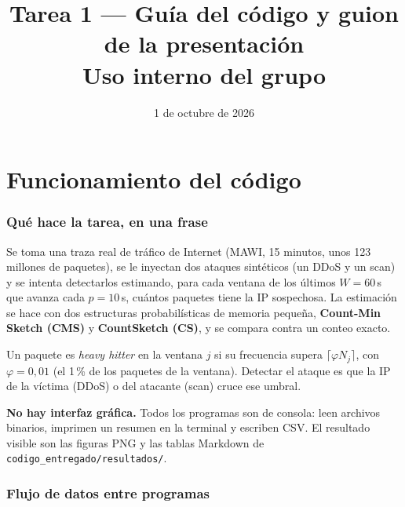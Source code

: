 \documentclass[11pt]{article}
\title{Tarea 1 — Guía del código y guion de la presentación\\[4pt]\large Uso interno del grupo}
\author{}
\date{1 de octubre de 2026}
\newcommand{\code}[1]{\texttt{#1}}
\begin{document}
\maketitle
\tableofcontents
\bigskip


\part{Funcionamiento del código}

\section{Qué hace la tarea, en una frase}

Se toma una traza real de tráfico de Internet (MAWI, 15 minutos, unos 123 millones de paquetes), se le inyectan dos ataques sintéticos (un DDoS y un scan) y se intenta detectarlos estimando, para cada ventana de los últimos $W=60$\,s que avanza cada $p=10$\,s, cuántos paquetes tiene la IP sospechosa. La estimación se hace con dos estructuras probabilísticas de memoria pequeña, \textbf{Count-Min Sketch (CMS)} y \textbf{CountSketch (CS)}, y se compara contra un conteo exacto.

Un paquete es \emph{heavy hitter} en la ventana $j$ si su frecuencia supera $\lceil\varphi N_j\rceil$, con $\varphi=0{,}01$ (el 1\,\% de los paquetes de la ventana). Detectar el ataque es que la IP de la víctima (DDoS) o del atacante (scan) cruce ese umbral.

\textbf{No hay interfaz gráfica.} Todos los programas son de consola: leen archivos binarios, imprimen un resumen en la terminal y escriben CSV. El resultado visible son las figuras PNG y las tablas Markdown de \code{codigo\_entregado/resultados/}.

\section{Flujo de datos entre programas}
\end{document}
